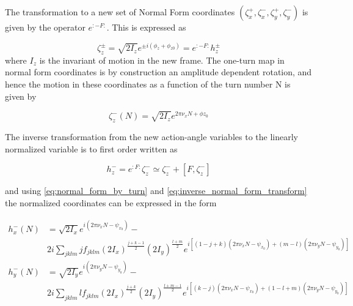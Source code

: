 The transformation to a new set of Normal Form coordinates \(\left(\zeta_{x}^{+}, \zeta_{x}^{-}, \zeta_{y}^{+}, \zeta_{y}^{-}\right)\) is given by the operator \(e^{: -F :}\).
This is expressed as

\begin{equation}
    \zeta_{z}^{\pm} = \sqrt{2 I_{z}} e^{\pm i \left(\phi_{z}+\phi_{z 0} \right)} = e^{:-F:} h_{z}^{\pm}
    \label{eq:action_angle_to_normal_form}
\end{equation}
where \(I_{z}\) is the invariant of motion in the new frame.
The one-turn map in normal form coordinates is by construction an amplitude dependent rotation, and hence the motion in these coordinates as a function of the turn number N is given by

\begin{equation}
    \zeta_{z}^{-}(N) = \sqrt{2 I_{z}} e^{2 \pi \nu_{x} N + \phi z_{0}}
    \label{eq:normal_form_by_turn}
\end{equation}

The inverse transformation from the new action-angle variables to the linearly normalized variable is to first order written as

\begin{equation}
    h_{z}^{-} = e^{: F:} \zeta_{z}^{-} \simeq \zeta_{z}^{-} + \left[F, \zeta_{z}^{-}\right]
    \label{eq:inverse_normal_form_transform}
\end{equation}

and using \cref{eq:normal_form_by_turn} and \cref{eq:inverse_normal_form_transform} the normalized coordinates can be expressed in the form

\begin{equation}
    \begin{aligned}
    h_{x}^{-}(N) &= \sqrt{2 I_{x}} e^{i\left(2 \pi \nu_{x} N - \psi_{x_{0}}\right)} - \\
    & 2 i \sum_{jklm} j f_{jklm} \left(2 I_{x}\right)^{\frac{j+k-1}{2}} \left(2 I_{y}\right)^{\frac{l+m}{2}} e^{i \left[(1-j+k) \left(2 \pi \nu_{x} N-\psi_{x_{0}}\right) + (m-l) \left(2 \pi \nu_{y} N-\psi_{y_{0}}\right) \right]} \\
    h_{y}^{-}(N) &= \sqrt{2 I_{y}} e^{i\left(2 \pi \nu_{y} N - \psi_{y_{0}}\right)} - \\
    & 2 i \sum_{jklm} l f_{jklm} \left(2 I_{x}\right)^{\frac{j+k}{2}} \left(2 I_{y}\right)^{\frac{l+m-1}{2}} e^{i \left[(k-j) \left(2 \pi \nu_{x} N-\psi_{x_{0}}\right) + (1-l+m) \left(2 \pi \nu_{y} N-\psi_{y_{0}}\right) \right]}
    \end{aligned}
    \label{eq:normal_form_coordinates}
\end{equation}


